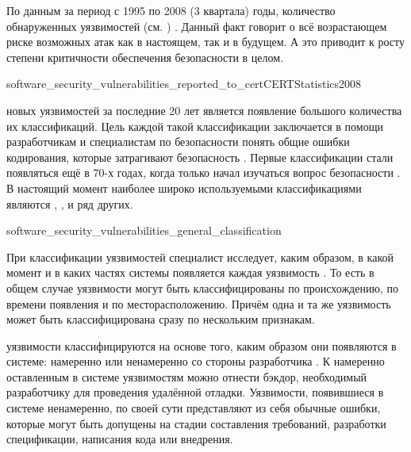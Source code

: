 %
По данным  за период с 1995 по 2008 (3 квартала) годы, количество обнаруженных уязвимостей   (см. ) . 
%
Данный факт говорит о всё возрастающем риске возможных атак как в настоящем, так и в будущем. 
%
А это приводит к росту степени критичности обеспечения безопасности  в целом. 

	{software_security_vulnerabilities_reported_to_cert}{CERTStatistics2008}

%
 новых уязвимостей за последние 20 лет является появление большого количества их классификаций. 
%
Цель каждой такой классификации заключается в помощи разработчикам  и специалистам по безопасности  понять общие ошибки кодирования, которые затрагивают безопасность . 
%
Первые классификации стали появляться ещё в 70-х годах, когда только начал изучаться вопрос безопасности  .  
%
В настоящий момент наиболее широко используемыми классификациями являются  ,  ,   и ряд других.


	{software_security_vulnerabilities_general_classification}

%
При классификации уязвимостей  специалист исследует, каким образом, в какой момент и в каких частях системы появляется каждая уязвимость   . 
%
То есть в общем случае уязвимости могут быть классифицированы по происхождению, по времени появления и по месторасположению. 
%
Причём одна и та же уязвимость может быть классифицирована сразу по нескольким признакам. 

%
 уязвимости классифицируются на основе того, каким образом они появляются в системе: намеренно или ненамеренно со стороны разработчика . 
%
К намеренно оставленным в системе уязвимостям можно отнести бэкдор, необходимый разработчику для проведения удалённой отладки. 
%
Уязвимости, появившиеся в системе ненамеренно, по своей сути представляют из себя обычные ошибки, которые могут быть допущены на стадии составления требований, разработки спецификации, написания кода или внедрения. 

